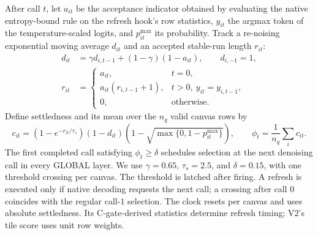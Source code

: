 \documentclass[10pt]{article}
\begin{document}
After call $t$, let $a_{it}$ be the acceptance indicator obtained by
evaluating the native entropy-bound rule on the refresh hook's row statistics,
$y_{it}$ the argmax token of the temperature-scaled logits, and
$p_{it}^{\max}$ its probability. Track a re-noising exponential moving
average $d_{it}$ and an accepted stable-run length $r_{it}$:
\begin{align}
 d_{it}&=\gamma d_{i,t-1}+(1-\gamma)(1-a_{it}),
          \qquad d_{i,-1}=1, \label{eq:v2-renoise}\\
 r_{it}&=
 \begin{cases}
   a_{it}, & t=0,\\
   a_{it}(r_{i,t-1}+1), & t>0,\ y_{it}=y_{i,t-1},\\
   0, & \text{otherwise}.
 \end{cases}
 \label{eq:v2-run}
\end{align}
Define settledness and its mean over the $n_q$ valid canvas rows by
\begin{equation}
 c_{it}=\left(1-e^{-r_{it}/\tau_s}\right)(1-d_{it})
        \left(1-\sqrt{\max\{0,1-p_{it}^{\max}\}}\right),
 \qquad \phi_t=\frac{1}{n_q}\sum_i c_{it}.
 \label{eq:v2-progress}
\end{equation}
The first completed call satisfying $\phi_t\ge\delta$ schedules selection
at the next denoising call in every GLOBAL layer. We use $\gamma=0.65$,
$\tau_s=2.5$, and $\delta=0.15$, with one threshold crossing per canvas.
The threshold is latched after firing. A refresh is executed only if native
decoding requests the next call; a crossing after call $0$ coincides with
the regular call-$1$ selection. The clock resets per canvas and uses
absolute settledness. Its C-gate-derived statistics determine refresh timing;
V2's tile score uses unit row weights.
\end{document}
